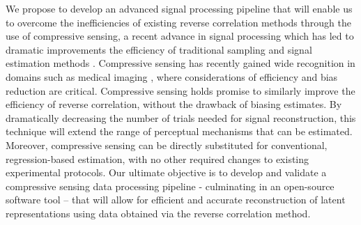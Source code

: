 \documentclass[11pt, notitlepage]{article} %
\begin{document}
We propose to develop an advanced signal processing pipeline that will enable us to overcome
the inefficiencies of existing reverse correlation methods through the use of compressive sensing, a
recent advance in signal processing which has led to dramatic improvements the efficiency of traditional
sampling and signal estimation methods \cite{baraniukCompressiveSensingLecture2007}. Compressive sensing has recently gained
wide recognition in domains such as medical imaging \cite{graffCompressiveSensingMedical2015,lustigCompressedSensingMRI2008}, where
considerations of efficiency and bias reduction are critical. Compressive sensing holds promise to
similarly improve the efficiency of reverse correlation, without the drawback of biasing estimates. By
dramatically decreasing the number of trials needed for signal reconstruction, this technique will extend
the range of perceptual mechanisms that can be estimated. Moreover, compressive sensing can be
directly substituted for conventional, regression-based estimation, with no other required changes to
existing experimental protocols. Our ultimate objective is to develop and validate a compressive sensing
data processing pipeline - culminating in an open-source software tool – that will allow for efficient and
accurate reconstruction of latent representations using data obtained via the reverse correlation method.


\end{document}
